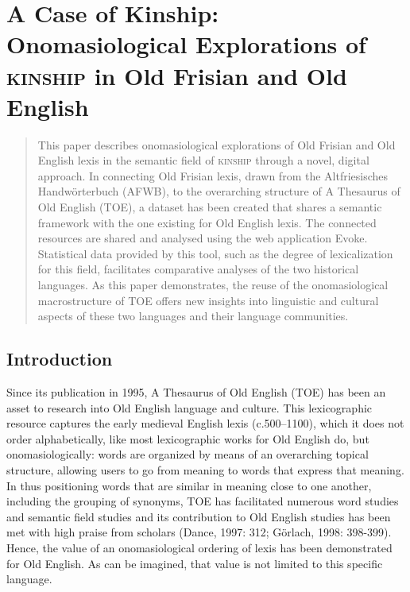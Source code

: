 

\chapter{A Case of Kinship: Onomasiological Explorations of \textsc{kinship} in Old Frisian and Old English}

\begin{abstract}
This paper describes onomasiological explorations of Old Frisian and Old English lexis in the semantic field of \textsc{kinship} through a novel, digital approach. In connecting Old Frisian lexis, drawn from the Altfriesisches Handwörterbuch (AFWB), to the overarching structure of A Thesaurus of Old English (TOE), a dataset has been created that shares a semantic framework with the one existing for Old English lexis. The connected resources are shared and analysed using the web application Evoke. Statistical data provided by this tool, such as the degree of lexicalization for this field, facilitates comparative analyses of the two historical languages. As this paper demonstrates, the reuse of the onomasiological macrostructure of TOE offers new insights into linguistic and cultural aspects of these two languages and their language communities.
\end{abstract}

\section{Introduction}
\label{sect:Stolk2021b:Introduction}

Since its publication in 1995, A Thesaurus of Old English (TOE) has been an asset to research into Old English language and culture. This lexicographic resource captures the early medieval English lexis (c.500–1100), which it does not order alphabetically, like most lexicographic works for Old English do, but onomasiologically: words are organized by means of an overarching topical structure, allowing users to go from meaning to words that express that meaning. In thus positioning words that are similar in meaning close to one another, including the grouping of synonyms, TOE has facilitated numerous word studies and semantic field studies  and its contribution to Old English studies has been met with high praise from scholars (Dance, 1997: 312; Görlach, 1998: 398-399). Hence, the value of an onomasiological ordering of lexis has been demonstrated for Old English. As can be imagined, that value is not limited to this specific language.

